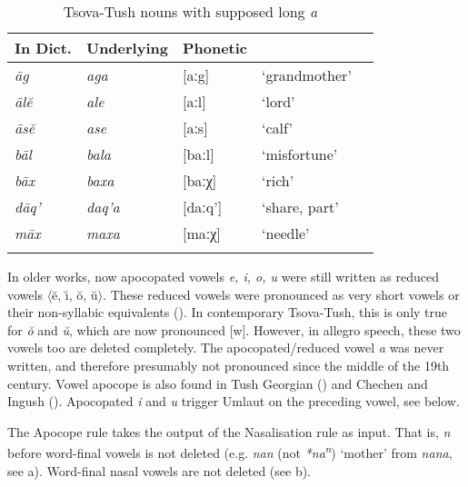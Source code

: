 \begin{table}
	\begin{tabular}{lllll}
    \lsptoprule
		In Dict. & {Underlying} & {Phonetic} & \\
		\midrule
		\textit{\={a}g} & \textit{aga} & [aːg] & `grandmother' \\
		\textit{\={a}l\u{e}} & \textit{ale} & [aːl] & `lord' \\
		\textit{\={a}s\u{e}} & \textit{ase} & [aːs] & `calf' \\
		\textit{b\={a}l} & \textit{bala} & [baːl] & `misfortune' \\
		\textit{b\={a}x} & \textit{baxa} & [baːχ] & `rich' \\
		\textit{d\={a}q'} & \textit{daq'a} & [daːq'] & `share, part' \\
		\textit{m\={a}x} & \textit{maxa} & [maːχ] & `needle' \\
		\lspbottomrule
		
	\end{tabular}
	\caption{Tsova-Tush nouns with supposed long \textit{a}}
	\label{phon-table4}
\end{table}

In older works, now apocopated vowels \textit{e, i, o, u} were still written as reduced vowels $\langle$\u{e}, \u{\i}, \u{o}, \u{u}$\rangle$. These reduced vowels were pronounced as very short vowels or their non-syllabic equivalents (\cite{gagua56vowel}). In contemporary Tsova-Tush, this is only true for \textit{\u{o}} and \textit{\u{u}}, which are now pronounced [w]. However, in allegro speech, these two vowels too are deleted completely. The apocopated/reduced vowel \textit{a} was never written, and therefore presumably not pronounced since the middle of the 19th century.
Vowel apocope is also found in Tush Georgian (\cite{kartulidialekt}) and Chechen and Ingush (\cite{nichols11}). Apocopated \textit{i} and \textit{u} trigger Umlaut on the preceding vowel, see below.

The Apocope rule takes the output of the Nasalisation rule as input. That is, \textit{n} before word-final vowels is not deleted (e.g.  \textit{nan} (not \textit{*na\textsuperscript{n}}) `mother' from \textit{nana}, see a). Word-final nasal vowels are not deleted (see b).

